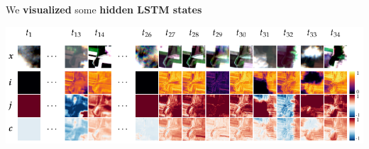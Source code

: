 \documentclass[a0]{tumposter}
\begin{document}
\begin{minipage}{0.49\linewidth}
	
	We \textbf{visualized} some \textbf{hidden LSTM states}
	
	\vspace{1em}
	
	\includegraphics[width=\textwidth]{images/activations}
	
	\vspace{1em}
	
%		
%		
%		
%		
%	
\end{minipage} 

\vspace{1em}
\end{document}
